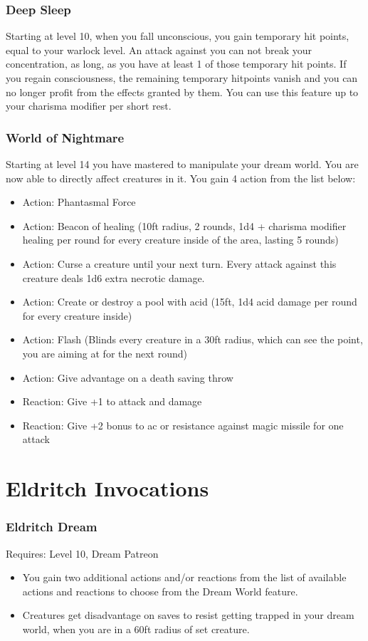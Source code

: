 \documentclass[a4paper,10pt,twoside,twocolumn]{dndbook} %
\begin{document}
	\subsection{Deep Sleep}
	Starting at level 10, when you fall unconscious, you gain temporary hit points, equal to your warlock level. An attack against you can not break your concentration, as long, as you have at least 1 of those temporary hit points. If you regain consciousness, the remaining temporary hitpoints vanish and you can no longer profit from the effects granted by them. You can use this feature up to your charisma modifier per short rest.
	\subsection{World of Nightmare}
	Starting at level 14 you have mastered to manipulate your dream world. You are now able to directly affect creatures in it. You gain 4 action from the list below:
	\begin{itemize}
		\item Action: Phantasmal Force
		\item Action: Beacon of healing (10ft radius, 2 rounds, 1d4 + charisma modifier healing per round for every creature inside of the area, lasting 5 rounds)
		\item Action: Curse a creature until your next turn. Every attack against this creature deals 1d6 extra necrotic damage.
		\item Action: Create or destroy a pool with acid (15ft, 1d4 acid damage per round for every creature inside)
		\item Action: Flash (Blinds every creature in a 30ft radius, which can see the point, you are aiming at for the next round)
		\item Action: Give advantage on a death saving throw
		\item Reaction: Give +1 to attack and damage
		\item Reaction: Give +2 bonus to ac or resistance against magic missile for one attack
	\end{itemize}
\chapter{Eldritch Invocations}
	\subsection{Eldritch Dream}
	Requires: Level 10, Dream Patreon
	\begin{itemize}
		\item You gain two additional actions and/or reactions from the list of available actions and reactions to choose from the Dream World feature. 
		\item Creatures get disadvantage on saves to resist getting trapped in your dream world, when you are in a 60ft radius of set creature.
	\end{itemize}
\end{document}
